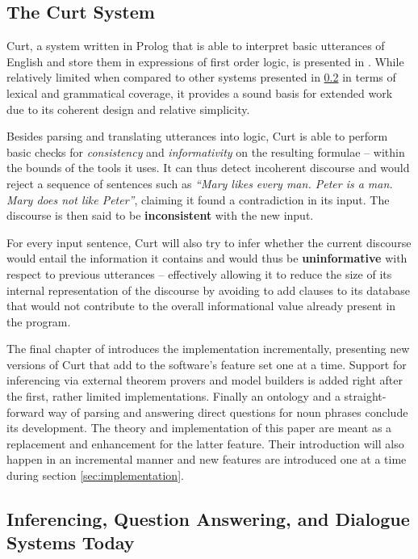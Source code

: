 \documentclass[a4paper]{article}
\newcommand{\term}[1]{\textsf{\textbf{#1}}} %
\newcommand{\pn}{\textsf} %
\newcommand{\curt}{\pn{Curt}}
\newcommand{\prol}{\pn{Prolog}}
\theoremstyle{remark}
\theoremstyle{remark}
\theoremstyle{definition}
\theoremstyle{definition}
\begin{document}
\subsection{The Curt System} \label{sec:curt}

\curt, a system written in \prol{} that is able to interpret basic utterances
of English and store them in expressions of first order logic, is
presented in \cite[chapter 6]{blackburnbos:cl1}. While relatively limited when
compared to other systems presented in \ref{sec:comparison} in terms of lexical
and grammatical coverage, it provides a sound basis for extended work due to
its coherent design and relative simplicity.

Besides parsing and translating utterances into logic, \curt{} is able to perform
basic checks for \emph{consistency} and \emph{informativity} on the resulting
formulae -- within the bounds of the tools it uses.
It can thus detect incoherent discourse and would reject a sequence of
sentences such as \emph{``Mary likes every man. Peter is a man. Mary does not
like Peter''}, claiming it found a contradiction in its input. The discourse is
then said to be \term{inconsistent} with the new input.

For every input
sentence, \curt{} will also try to infer whether the current discourse would
entail the information it contains and would thus be \term{uninformative} with
respect to previous utterances – effectively allowing it to
reduce the size of its internal representation of the discourse by avoiding to
add clauses to its database that would not contribute to the overall informational value
already present in the program.

The final chapter of \cite{blackburnbos:cl1} introduces the implementation
incrementally, presenting new versions of \curt{} that add to the software's
feature set one at a time. Support for inferencing via external theorem provers
and model builders is added right after the first, rather limited implementations.
Finally an ontology and a straight-forward way of parsing and answering direct
questions for noun phrases conclude its development. The theory and
implementation of this paper are meant as a replacement and enhancement for the
latter feature. Their introduction will also happen in an incremental manner and new features
are introduced one at a time during section \ref{sec:implementation}.

\subsection{Inferencing, Question Answering, and Dialogue Systems Today}\label{sec:comparison}
\end{document}

